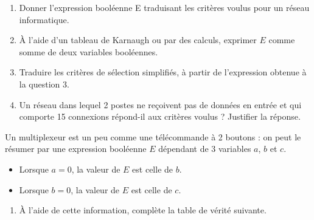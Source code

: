 \begin{exercice}[]
\begin{enumerate}
        \item Donner l'expression booléenne E traduisant les critères voulus pour un réseau informatique.
        \item À l'aide d'un tableau de Karnaugh ou par des calculs, exprimer $E$ comme somme de deux
              variables booléennes.
        \item Traduire les critères de sélection simplifiés, à partir de l'expression obtenue à la question 3.
        \item Un réseau dans lequel 2 postes ne reçoivent pas de données en entrée et qui comporte 15
              connexions répond-il aux critères voulus ? Justifier la réponse.
    \end{enumerate}
\end{exercice}

\begin{exercice}[ : multiplexeur]
    Un multiplexeur est un peu comme une télécommande à 2 boutons : on peut le résumer par une expression booléenne $E$ dépendant de 3 variables $a$, $b$ et $c$.
    \begin{itemize}
        \item Lorsque $a=0$, la valeur de $E$ est celle de $b$.
        \item Lorsque $b=0$, la valeur de $E$ est celle de $c$.
    \end{itemize}
    \begin{enumerate}
        \item À l'aide de cette information, complète la table de vérité suivante.

              \begin{center}
                  \tabstyled
                  \begin{tabular}{|c|c|c|c|}
                      \hline
                      

\end{tabular}
\end{center}
\end{enumerate}
\end{exercice}
